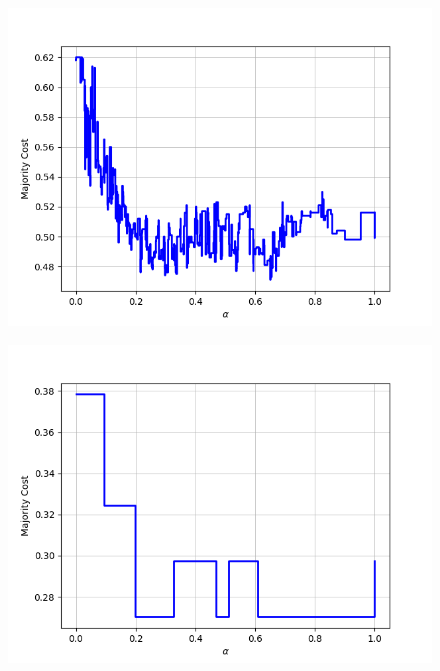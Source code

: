 \begin{figure}[h]
\begin{minipage}{.24\textwidth}
  {\includegraphics[width=\linewidth]{plots/nell-ac/person}}
\end{minipage}
\begin{minipage}{.24\textwidth}
  \centering
  {\includegraphics[width=\linewidth]{plots/nell-ac/personbylocation}}
\end{minipage}
\end{figure}
